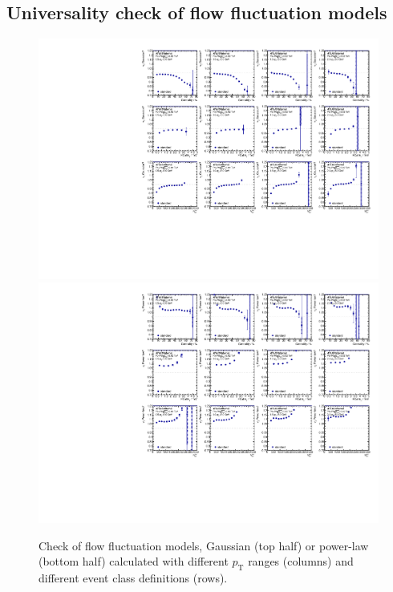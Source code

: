\subsection{Universality check of flow fluctuation models}
\begin{figure}[H]
\centering
\includegraphics[width=.95\linewidth]{figs/sec_result/forQM/phy_isGauss_Har2.pdf}
\includegraphics[width=.95\linewidth]{figs/sec_result/forQM/phy_isPower_Har2.pdf}
\caption{Check of flow fluctuation models, Gaussian (top half) or power-law (bottom half) calculated with different $p_\text{T}$ ranges (columns) and different event class definitions (rows).}
\label{fig:result_phy_fluc_Har2}
\end{figure}
